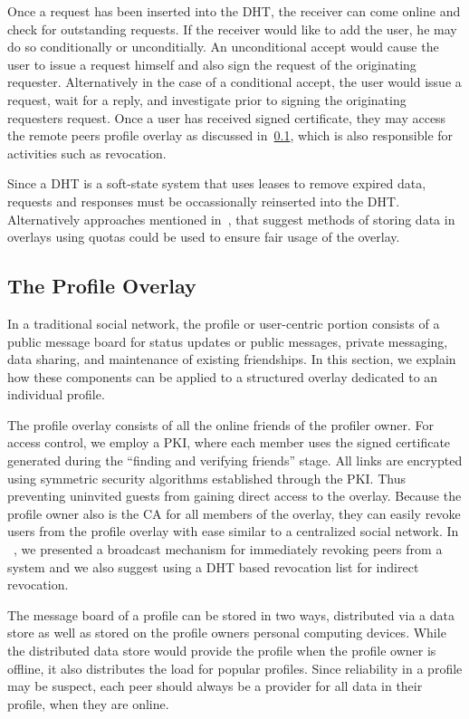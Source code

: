 \documentclass[letterpaper,twocolumn,10pt]{article}
\begin{document}
Once a request has been inserted into the DHT, the receiver can come online and
check for outstanding requests.  If the receiver would like to add the user, he
may do so conditionally or unconditially.  An unconditional accept would cause
the user to issue a request himself and also sign the request of the originating
requester.  Alternatively in the case of a conditional accept, the user would
issue a request, wait for a reply, and investigate prior to signing the originating
requesters request.  Once a user has received signed certificate, they may access
the remote peers profile overlay as discussed in~\ref{profile_overlay}, which is
also responsible for activities such as revocation.

Since a DHT is a soft-state system that uses leases to remove expired data, requests
and responses must be occassionally reinserted into the DHT.  Alternatively
approaches mentioned in~\cite{}, that suggest methods of storing data in overlays
using quotas could be used to ensure fair usage of the overlay.

\subsection{The Profile Overlay}
\label{profile_overlay} In a traditional social network, the profile or
user-centric portion consists of a public message board for status updates or
public messages, private
messaging, data sharing, and maintenance of existing friendships.  In this
section, we explain how these components can be applied to a structured overlay
dedicated to an individual profile.

The profile overlay consists of all the online friends of the profiler owner.
For access control, we employ a PKI, where each member uses the signed certificate
generated during the ``finding and verifying friends'' stage.  All links are
encrypted using symmetric security algorithms established through the PKI.
Thus preventing uninvited guests from gaining direct access to the overlay.
Because the profile owner also is the CA for all members of the overlay, they
can easily revoke users from the profile overlay with ease similar to a
centralized social network.  In ~\cite{icdcs10}, we presented a broadcast mechanism
for immediately revoking peers from a system and we also suggest using a DHT based
revocation list for indirect revocation.

The message board of a profile can be stored in two ways, distributed via a
data store as well as stored on the profile owners personal computing devices.
While the distributed data store would provide the profile when the profile
owner is offline, it also distributes the load for popular profiles.  Since
reliability in a profile may be suspect, each peer should always be a provider
for all data in their profile, when they are online.
\end{document}
